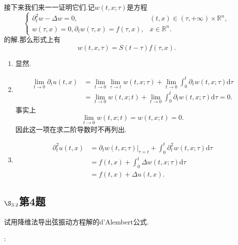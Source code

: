 \documentclass[12pt, a4paper]{ctexbook}
\renewcommand{\d}{\text{d}}
\begin{document}
    接下来我们来一一证明它们.记$w(t,x;\tau)$是方程
    \begin{equation*}
    \begin{cases}
    \partial_t^2w-\Delta w =0,&(t,x) \in (\tau,+\infty)\times \mathbb{R}^n,\\
    w(\tau,x) = 0,\partial_t w(\tau,x) = f(\tau,x) ,&x \in \mathbb{R}^n.
    \end{cases}
    \end{equation*}
    的解.那么形式上有
    \begin{equation*}
    w(t,x,\tau) = S(t-\tau)f(\tau,x).
    \end{equation*}
    \begin{enumerate}
        \item 显然.
        \item 
        \begin{align*}
        \lim\limits_{t\to 0} \partial_t u(t,x)& = \lim\limits_{t\to 0}\lim\limits_{\tau\to t}w(t,x;\tau)+\lim\limits_{t\to 0} \int_0^t\partial_tw(t,x;\tau)\d\tau\\
        &=\lim\limits_{t\to 0}w(t,x;t) + \lim\limits_{t\to 0} \int_0^t\partial_tw(t,x;\tau)\d\tau=0.
        \end{align*}
        事实上
        \begin{equation*}
        \lim\limits_{t\to 0}w(t,x;t) = w(t,x;t) = 0.
        \end{equation*}
        因此这一项在求二阶导数时不再列出.
        \item
        \begin{align*}
        \partial_t^2u(t,x) &=\left.\partial_t w(t,x;\tau)\right|_{\tau=t} + \int_0^t\partial_t^2w(t,x;\tau)\d\tau\\
        & = f(t,x) + \int_0^t\Delta w(t,x;\tau)\d\tau\\
        & = f(t,x) + \Delta u(t,x).
        \end{align*}
    \end{enumerate}
    
    
    
    
    
    \subsection{$\S_{3.2}$第4题}
    \kaishu{}
    
    试用降维法导出弦振动方程解的d'Alembert公式.
    
    \songti{}:\\
    
\end{document}
